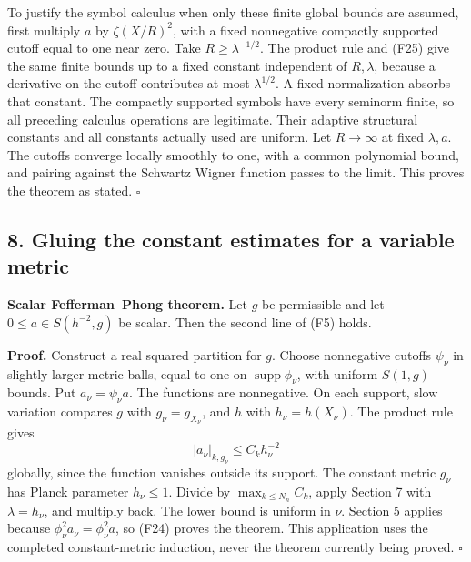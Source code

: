 \documentclass[
  11pt,
]{article}
\makeatletter
\let\ReaderOriginalAnchorStart\hyper@anchorstart
\let\ReaderOriginalAnchorEnd\hyper@anchorend
\let\ReaderPendingAliases\@empty
\def\ReaderArmAliases#1{\gdef\ReaderPendingAliases{#1}}
\def\hyper@anchorstart#1{\ReaderIfNativeAnchorTF{#1}{\ReaderPendingAliases\global\let\ReaderPendingAliases\@empty}{}\ReaderOriginalAnchorStart{#1}}
\makeatother
\begin{document}
To justify the symbol calculus when only these finite global bounds are
assumed, first multiply \(a\) by \(\zeta(X/R)^2\), with a fixed
nonnegative compactly supported cutoff equal to one near zero. Take
\(R\geq\lambda^{-1/2}\). The product rule and (F25) give the same finite
bounds up to a fixed constant independent of \(R,\lambda\), because a
derivative on the cutoff contributes at most \(\lambda^{1/2}\). A fixed
normalization absorbs that constant. The compactly supported symbols
have every seminorm finite, so all preceding calculus operations are
legitimate. Their adaptive structural constants and all constants
actually used are uniform. Let \(R\to\infty\) at fixed \(\lambda,a\).
The cutoffs converge locally smoothly to one, with a common polynomial
bound, and pairing against the Schwartz Wigner function passes to the
limit. This proves the theorem as stated. \(\square\)

\ReaderArmAliases{\ReaderOriginalAnchorStart{AN03-SFP-008}\ReaderOriginalAnchorEnd\begingroup\expandafter\def\csname @currentHref\endcsname{AN03-SFP-008}\label{AN03-SFP-008}\endgroup\ReaderOriginalAnchorStart{an03-sfp-008-gluing-the-constant-estimates-for-a-variable-metric}\ReaderOriginalAnchorEnd\begingroup\expandafter\def\csname @currentHref\endcsname{an03-sfp-008-gluing-the-constant-estimates-for-a-variable-metric}\label{an03-sfp-008-gluing-the-constant-estimates-for-a-variable-metric}\endgroup\ReaderOriginalAnchorStart{8-gluing-the-constant-estimates-for-a-variable-metric}\ReaderOriginalAnchorEnd\begingroup\expandafter\def\csname @currentHref\endcsname{8-gluing-the-constant-estimates-for-a-variable-metric}\label{8-gluing-the-constant-estimates-for-a-variable-metric}\endgroup\ReaderOriginalAnchorStart{gluing-the-constant-estimates-for-a-variable-metric}\ReaderOriginalAnchorEnd}
\subsection{8. Gluing the constant estimates for a variable
metric}\label{gluing-the-constant-estimates-for-a-variable-metric}

\textbf{Scalar Fefferman--Phong theorem.} Let \(g\) be permissible and
let \(0\leq a\in S(h^{-2},g)\) be scalar. Then the second line of (F5)
holds.

\textbf{Proof.} Construct a real squared partition for \(g\). Choose
nonnegative cutoffs \(\psi_\nu\) in slightly larger metric balls, equal
to one on \(\operatorname{supp}\phi_\nu\), with uniform \(S(1,g)\)
bounds. Put \(a_\nu=\psi_\nu a\). The functions are nonnegative. On each
support, slow variation compares \(g\) with \(g_\nu=g_{X_\nu}\), and
\(h\) with \(h_\nu=h(X_\nu)\). The product rule gives \[
|a_\nu|_{k,g_\nu}\leq C_k h_\nu^{-2}
\tag{F38}
\] globally, since the function vanishes outside its support. The
constant metric \(g_\nu\) has Planck parameter \(h_\nu\leq1\). Divide by
\(\max_{k\leq N_n}C_k\), apply Section 7 with \(\lambda=h_\nu\), and
multiply back. The lower bound is uniform in \(\nu\). Section 5 applies
because \(\phi_\nu^2a_\nu=\phi_\nu^2a\), so (F24) proves the theorem.
This application uses the completed constant-metric induction, never the
theorem currently being proved. \(\square\)
\end{document}
